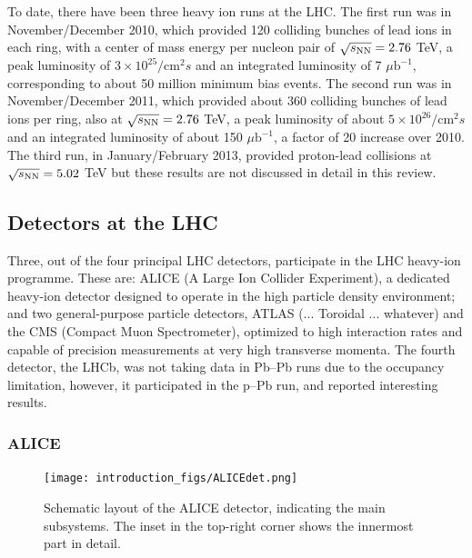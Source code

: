 To date, there have been three heavy ion runs at the LHC.
The first run was in November/December 2010,
which provided 120 colliding bunches of lead ions in each ring, with a center of mass energy per nucleon
pair of $\mbox{$\sqrt{s_{\mathrm{NN}}}$} =2.76$ TeV, a peak luminosity of $3 \times 10^{25} / \mathrm{cm}^2 s$ and an integrated luminosity
of 7 $\mu \mathrm{b}^{-1}$, corresponding to about 50 million minimum bias events.
The second run was in November/December 2011, which provided about 360 colliding bunches of lead ions per ring,
also at $\mbox{$\sqrt{s_{\mathrm{NN}}}$} =2.76$ TeV, a peak luminosity of
about $5 \times 10^{26}  / \mathrm{cm}^2 s$ and an integrated luminosity of
about 150 $\mu \mathrm{b}^{-1}$, a factor of 20 increase over 2010.
The third run, in January/February 2013, provided proton-lead collisions
at $\mbox{$\sqrt{s_{\mathrm{NN}}}$}=5.02$ TeV but these results are not discussed
in detail in this review.

\subsection{Detectors at the LHC}
\label{subsecall:detectors}

Three, out of the four principal LHC detectors, participate in the LHC heavy-ion programme. These are: ALICE (A Large Ion Collider Experiment), a dedicated heavy-ion detector designed to operate in the high particle density environment; and two general-purpose particle detectors, ATLAS (... Toroidal ... whatever) and the CMS (Compact Muon Spectrometer), optimized to high interaction rates and capable of precision measurements at very high transverse momenta. The fourth detector, the LHCb, was not taking data in Pb--Pb runs due to the occupancy limitation, however, it participated in the p--Pb run, and reported interesting results.

\subsubsection{ALICE}

\begin{figure}
\begin{center}
\texttt{[image: introduction\_figs/ALICEdet.png]}
\caption{Schematic layout of the ALICE detector, indicating the main subsystems. The inset in the top-right corner shows the innermost part in detail.}
\label{figks:ALICEdet}
\end{center}
\end{figure}


